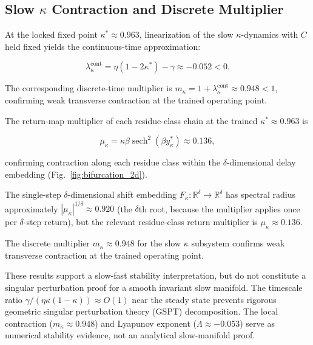 \documentclass[12pt,a4paper]{article}
\begin{document}
\subsection{Slow $\kappa$ Contraction and Discrete Multiplier}

\label{sec:kappa_eigenvalue}



At the locked fixed point $\kappa^* \approx 0.963$, linearization of the slow $\kappa$-dynamics with $C$ held fixed yields the continuous-time approximation:

\[

\lambda_\kappa^{\mathrm{cont}} = \eta(1 - 2\kappa^*) - \gamma \approx -0.052 < 0.

\]

The corresponding discrete-time multiplier is $m_\kappa = 1 + \lambda_\kappa^{\mathrm{cont}} \approx 0.948 < 1$, confirming weak transverse contraction at the trained operating point.



The return-map multiplier of each residue-class chain at the trained $\kappa^*\approx0.963$ is

\[

\mu_\kappa = \kappa\beta\operatorname{sech}^2(\beta y_\kappa^*) \approx 0.136,

\]

confirming contraction along each residue class within the $\delta$-dimensional delay embedding (Fig.~\ref{fig:bifurcation_2d}).

The single-step $\delta$-dimensional shift embedding $F_\kappa:\mathbb{R}^\delta\to\mathbb{R}^\delta$ has spectral radius approximately $|\mu_\kappa|^{1/\delta}\approx 0.920$ (the $\delta$th root, because the multiplier applies once per $\delta$-step return), but the relevant residue-class return multiplier is $\mu_\kappa\approx 0.136$.

The discrete multiplier $m_\kappa \approx 0.948$ for the slow $\kappa$ subsystem confirms weak transverse contraction at the trained operating point.

These results support a slow-fast stability interpretation, but do not constitute a singular perturbation proof for a smooth invariant slow manifold. The timescale ratio $\gamma/(\eta\kappa(1-\kappa)) \approx O(1)$ near the steady state prevents rigorous geometric singular perturbation theory (GSPT) decomposition. The local contraction ($m_\kappa \approx 0.948$) and Lyapunov exponent ($\Lambda \approx -0.053$) serve as numerical stability evidence, not an analytical slow-manifold proof.
\end{document}
